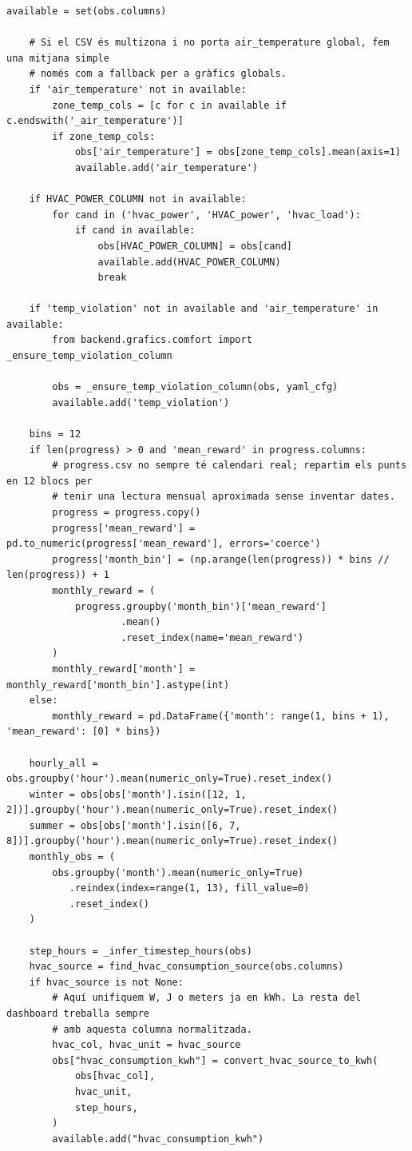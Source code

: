 \documentclass[10pt,a4paper]{article}
\begin{document}
\begin{lstlisting}[style=studioPython,caption={backend/grafics/metrics.py},label={lst:backend-grafics-metrics-py}]
    available = set(obs.columns)

    # Si el CSV és multizona i no porta air_temperature global, fem una mitjana simple
    # només com a fallback per a gràfics globals.
    if 'air_temperature' not in available:
        zone_temp_cols = [c for c in available if c.endswith('_air_temperature')]
        if zone_temp_cols:
            obs['air_temperature'] = obs[zone_temp_cols].mean(axis=1)
            available.add('air_temperature')

    if HVAC_POWER_COLUMN not in available:
        for cand in ('hvac_power', 'HVAC_power', 'hvac_load'):
            if cand in available:
                obs[HVAC_POWER_COLUMN] = obs[cand]
                available.add(HVAC_POWER_COLUMN)
                break

    if 'temp_violation' not in available and 'air_temperature' in available:
        from backend.grafics.comfort import _ensure_temp_violation_column

        obs = _ensure_temp_violation_column(obs, yaml_cfg)
        available.add('temp_violation')

    bins = 12
    if len(progress) > 0 and 'mean_reward' in progress.columns:
        # progress.csv no sempre té calendari real; repartim els punts en 12 blocs per
        # tenir una lectura mensual aproximada sense inventar dates.
        progress = progress.copy()
        progress['mean_reward'] = pd.to_numeric(progress['mean_reward'], errors='coerce')
        progress['month_bin'] = (np.arange(len(progress)) * bins // len(progress)) + 1
        monthly_reward = (
            progress.groupby('month_bin')['mean_reward']
                    .mean()
                    .reset_index(name='mean_reward')
        )
        monthly_reward['month'] = monthly_reward['month_bin'].astype(int)
    else:
        monthly_reward = pd.DataFrame({'month': range(1, bins + 1), 'mean_reward': [0] * bins})

    hourly_all = obs.groupby('hour').mean(numeric_only=True).reset_index()
    winter = obs[obs['month'].isin([12, 1, 2])].groupby('hour').mean(numeric_only=True).reset_index()
    summer = obs[obs['month'].isin([6, 7, 8])].groupby('hour').mean(numeric_only=True).reset_index()
    monthly_obs = (
        obs.groupby('month').mean(numeric_only=True)
           .reindex(index=range(1, 13), fill_value=0)
           .reset_index()
    )

    step_hours = _infer_timestep_hours(obs)
    hvac_source = find_hvac_consumption_source(obs.columns)
    if hvac_source is not None:
        # Aquí unifiquem W, J o meters ja en kWh. La resta del dashboard treballa sempre
        # amb aquesta columna normalitzada.
        hvac_col, hvac_unit = hvac_source
        obs["hvac_consumption_kwh"] = convert_hvac_source_to_kwh(
            obs[hvac_col],
            hvac_unit,
            step_hours,
        )
        available.add("hvac_consumption_kwh")


\end{lstlisting}
\end{document}
